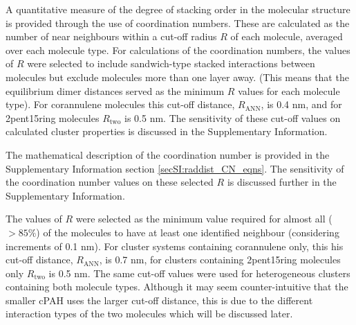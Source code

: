 A quantitative measure of the degree of stacking order in the molecular structure is provided through the use of coordination numbers. These are calculated as the number of near neighbours within a cut-off radius $R$ of each molecule, averaged over each molecule type. 
For calculations of the coordination numbers, the values of $R$ were selected to include sandwich-type stacked interactions between molecules but exclude molecules more than one layer away. (This means that the equilibrium dimer distances served as the minimum $R$ values for each molecule type). For corannulene molecules this cut-off distance, $R_{\text{ANN}}$, is 0.4 nm, and for 2pent15ring molecules $R_{\text{two}}$ is 0.5 nm.  
The sensitivity of these cut-off values on calculated cluster properties is discussed in the Supplementary Information.

The mathematical description of the coordination number is provided in the Supplementary Information section \ref{secSI:raddist_CN_eqns}.
The sensitivity of the coordination number values on these selected $R$ is discussed further in the Supplementary Information.

The values of $R$ were selected as the minimum value required for almost all ($>85\%$) of the molecules to have at least one identified neighbour (considering increments of 0.1 nm).  For cluster systems containing corannulene only, this his cut-off distance, $R_{\text{ANN}}$, is 0.7 nm, for clusters containing 2pent15ring molecules only $R_{\text{two}}$ is 0.5 nm. The same cut-off values were used for heterogeneous clusters containing both molecule types.
Although it may seem counter-intuitive that the smaller cPAH uses the larger cut-off distance, this is due to the different interaction types of the two molecules which will be discussed later.

